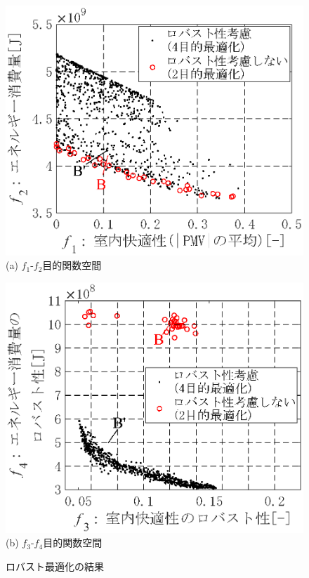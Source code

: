\begin{figure}[htbp]
    \begin{center}
        \includegraphics[width=0.7\columnwidth,keepaspectratio=true]{fig/robust_result_pareto_f1f2.eps}\\
        {(a) $f_1$-$f_2$目的関数空間}
    \end{center}
    \begin{center}
        \includegraphics[width=0.7\columnwidth,keepaspectratio=true]{fig/robust_result_pareto_f3f4.eps}\\
        {(b) $f_3$-$f_4$目的関数空間}
    \end{center}
    \caption{ロバスト最適化の結果}
    \label{fig::robust_result_pareto}
\end{figure}

